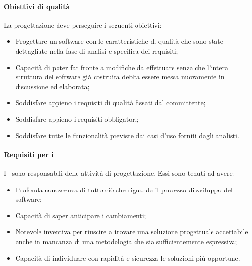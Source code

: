 \documentclass[../NormeDiProgetto_v4.0.0.tex]{subfiles}
\begin{document}
		\paragraph{Obiettivi di qualità}
			La progettazione deve perseguire i seguenti obiettivi:
			\begin{itemize}
				\item Progettare un software con le caratteristiche di qualità che sono state dettagliate nella fase di analisi e specifica dei requisiti;
				\item Capacità di poter far fronte a modifiche da effettuare senza che l'intera struttura del software già costruita debba essere messa nuovamente in discussione ed elaborata;
				\item Soddisfare appieno i requisiti di qualità fissati dal committente;
				\item Soddisfare appieno i requisiti obbligatori;
				\item Soddisfare tutte le funzionalità previste dai casi d'uso forniti dagli analisti.
			\end{itemize}

		\paragraph{Requisiti per i \progettisti}
			I \progettisti\ sono responsabili delle attività di progettazione. Essi sono tenuti ad avere:
			\begin{itemize}
				\item Profonda conoscenza di tutto ciò che riguarda il processo di sviluppo del software;
				\item Capacità di saper anticipare i cambiamenti;
				\item Notevole inventiva per riuscire a trovare una soluzione progettuale accettabile anche in mancanza di una metodologia che sia sufficientemente espressiva;
				\item Capacità di individuare con rapidità e sicurezza le soluzioni più opportune.
			\end{itemize}
\end{document}
